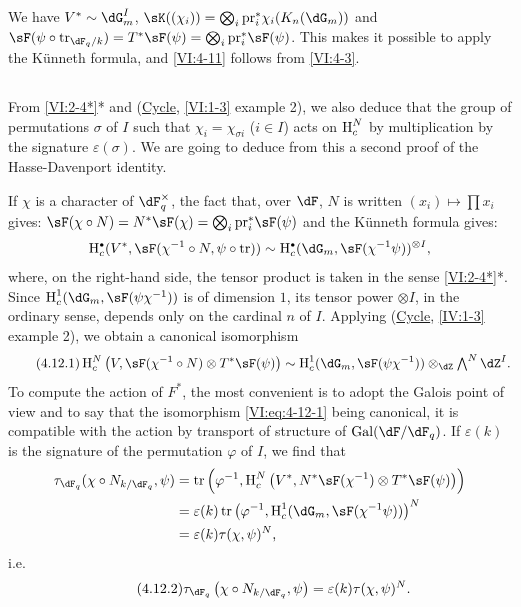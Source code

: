 We have $V^\ast\sim \dG_m^I$,
$\sK((\chi_i)) = \bigotimes_i \pr_i^\ast \chi_i(K_n(\dG_m))$ and
$\sF(\psi\circ \tr_{\dF_q/k})=T^\ast \sF(\psi) = \bigotimes_i \pr_i^\ast \sF(\psi)$.
This makes it possible to apply the K\"unneth formula, and \ref{VI:4-11} follows from
\ref{VI:4-3}. 





\subsection{}\label{VI:4-12}

From \ref{VI:2-4*}* and (\hyperref[VI]{Cycle}, \ref{VI:1-3} example 2), we also
deduce that the group of permutations $\sigma$ of $I$ such that
$\chi_i = \chi_{\sigma i}$ ($i\in I$) acts on $\operatorname{H}_c^N$ by multiplication by
the signature $\varepsilon(\sigma)$. We are going to deduce from this a second proof
of the Hasse-Davenport identity.

If $\chi$ is a character of $\dF_q^\times$, the fact that, over $\dF$, $N$
is written $(x_i)\mapsto \prod x_i$ gives: 
$\sF(\chi\circ N)=N^\ast\sF(\chi) = \bigotimes_i \pr_i^\ast\sF(\psi)$ 
and the K\"unneth formula gives: 
\[
  \h_c^\bullet(V^\ast,\sF(\chi^{-1}\circ N,\psi\circ \tr)) \sim \h_c^\bullet(\dG_m,\sF(\chi^{-1}\psi))^{\otimes I} \text{,} 
\]
where, on the right-hand side, the tensor product is taken in the sense
\ref{VI:2-4*}*. Since $\h_c^1(\dG_m,\sF(\psi\chi^{-1}))$ is of dimension
$1$, its tensor power $\otimes I$, in the ordinary sense, depends only
on the cardinal $n$ of $I$. Applying (\hyperref[IV]{Cycle}, \ref{IV:1-3} example
2), we obtain a canonical isomorphism 
\begin{equation*}\tag{4.12.1}\label{VI:eq:4-12-1}
  \h_c^N\left(V,\sF(\chi^{-1}\circ N)\otimes T^\ast \sF(\psi)\right) \sim \h_c^1(\dG_m,\sF(\psi\chi^{-1})) \otimes_\dZ \textstyle \bigwedge^N \dZ^I \text{.}
\end{equation*}
To compute the action of $F^\ast$, the most convenient is to adopt the
Galois point of view and to say that the isomorphism \eqref{VI:eq:4-12-1} being
canonical, it is compatible with the action by transport of structure of
$\gal(\dF/\dF_q)$. If $\varepsilon(k)$ is the signature of the permutation
$\varphi$ of $I$, we find that 
\begin{align*} 
  \tau_{\dF_q}(\chi\circ N_{k/\dF_q},\psi) 
    &= \tr\left(\varphi^{-1},\h_c^N\left(V^\ast,N^\ast\sF(\chi^{-1})\otimes T^\ast \sF(\psi)\right)\right) \\ 
    &= \varepsilon(k) \tr\left(\varphi^{-1},\h_c^1(\dG_m,\sF(\chi^{-1}\psi))\right)^N \\
    &= \varepsilon(k) \tau(\chi,\psi)^N \text{,}
\end{align*}
i.e.
\begin{equation*}\tag{4.12.2}\label{VI:eq:4-12-2}
  \tau_{\dF_q}\left(\chi\circ N_{k/\dF_q},\psi\right) = \varepsilon(k) \tau(\chi,\psi)^N \text{.} 
\end{equation*}

